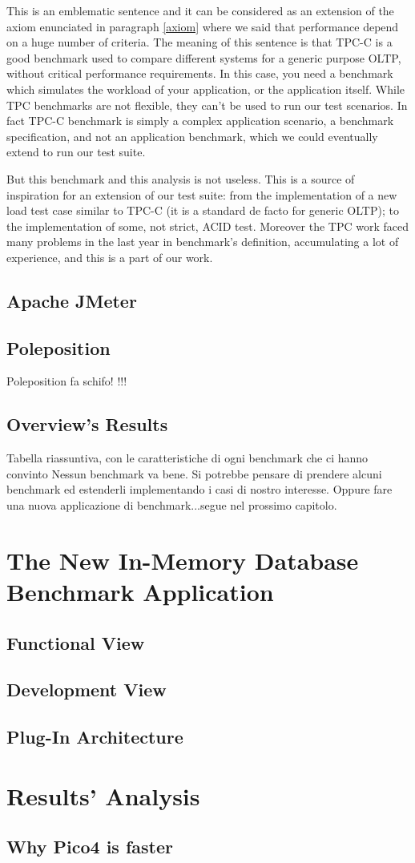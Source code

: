 This is an emblematic sentence and it can be considered as an extension of the axiom enunciated in paragraph \ref{axiom} where we said that performance depend on a huge number of criteria. The meaning of this sentence is that TPC-C is a good benchmark used to compare different systems for a generic purpose OLTP, without critical performance requirements. In this case, you need a benchmark which simulates the workload of your application, or the application itself. While TPC benchmarks are not flexible, they can't be used to run our test scenarios. In fact TPC-C benchmark is simply a complex application scenario, a benchmark specification, and not an application benchmark, which we could eventually extend to run our test suite.

But this benchmark and this analysis is not useless. This is a source of inspiration for an extension of our test suite: from the implementation of a new load test case similar to TPC-C (it is a standard de facto for generic OLTP); to the implementation of some, not strict, ACID test. Moreover the TPC work faced many problems in the last year in benchmark's definition, accumulating a lot of experience, and this is a part of our work.
	
	\section{Apache JMeter}
	
	\section{Poleposition} \label{poleposition}
	Poleposition fa schifo! \cite{poleposition}!!!
	
	\section{Overview's Results}
Tabella riassuntiva, con le caratteristiche di ogni benchmark che ci hanno convinto
Nessun benchmark va bene.
Si potrebbe pensare di prendere alcuni benchmark ed estenderli implementando i casi di nostro interesse.
Oppure fare una nuova applicazione di benchmark...segue nel prossimo capitolo.
	
	
	
	
\chapter{The New In-Memory Database Benchmark Application}
	\section{Functional View}
	\section{Development View}
	\section{Plug-In Architecture}

\chapter{Results' Analysis}
	\section{Why Pico4 is faster}
